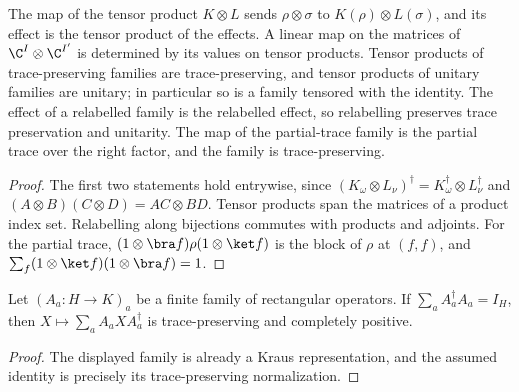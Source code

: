 \begin{lemma}
    \label{lem:kraus_family_prod}
    \leanok
    The map of the tensor product $K\otimes L$ sends $\rho\otimes\sigma$ to
    $K(\rho)\otimes L(\sigma)$, and its effect is the tensor product of the effects. A
    linear map on the matrices of $\C^I\otimes\C^{I'}$ is determined by its values on
    tensor products. Tensor products of trace-preserving families are trace-preserving,
    and tensor products of unitary families are unitary; in particular so is a family
    tensored with the identity. The effect of a relabelled family is the relabelled
    effect, so relabelling preserves trace preservation and unitarity. The map of the partial-trace
    family is the partial trace over the right factor, and the family is
    trace-preserving.
\end{lemma}
\begin{proof}\leanok
    The first two statements hold entrywise, since
    $(K_\omega\otimes L_\nu)^\dagger=K_\omega^\dagger\otimes L_\nu^\dagger$ and
    $(A\otimes B)(C\otimes D)=AC\otimes BD$. Tensor products span the matrices of a
    product index set. Relabelling along bijections commutes with products and
    adjoints. For the partial trace,
    $(1\otimes\bra f)\rho(1\otimes\ket f)$ is the block of $\rho$ at $(f,f)$, and
    $\sum_f(1\otimes\ket f)(1\otimes\bra f)=1$.
\end{proof}

\begin{theorem}
    \label{thm:mpdo_rectangular_kraus_map_cptp}
    \leanok
    Let $(A_a:H\to K)_a$ be a finite family of rectangular operators. If
    $\sum_a A_a^\dagger A_a=I_H$, then
    $X\mapsto\sum_a A_aXA_a^\dagger$ is trace-preserving and completely
    positive.
\end{theorem}
\begin{proof}\leanok
    The displayed family is already a Kraus representation, and the assumed
    identity is precisely its trace-preserving normalization.
\end{proof}

